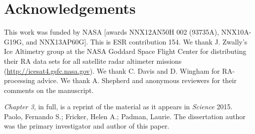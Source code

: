 \clearpage
\section*{Acknowledgements}

This work was funded by NASA [awards NNX12AN50H 002
(93735A), NNX10A-G19G, and NNX13AP60G]. This is ESR
contribution 154. We thank J. Zwally's Ice Altimetry group
at the NASA Goddard Space Flight Center for distributing their
RA data sets for all satellite radar altimeter missions
(\url{http://icesat4.gsfc.nasa.gov}). We thank C. Davis and D. Wingham for
RA-processing advice. We thank A. Shepherd and anonymous
reviewers for their comments on the manuscript.


{\sl Chapter 3}, in full, is a reprint of the material as it appears in {\it Science}
2015. Paolo, Fernando S.; Fricker, Helen A.; Padman, Laurie. The dissertation
author was the primary investigator and author of this paper.

